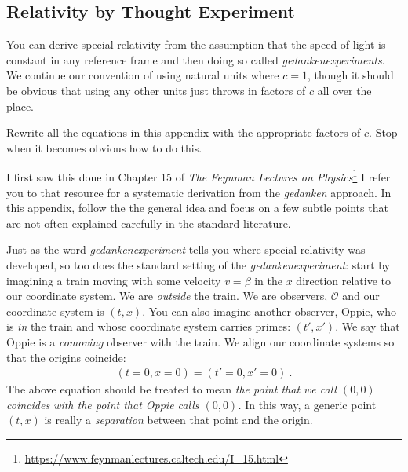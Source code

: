 \begin{subappendices}

\section{Relativity by Thought Experiment}\label{sec:subappendix:relativity}
You can derive special relativity from the assumption that the speed of light is constant in any reference frame and then doing so called \emph{gedankenexperiments}. We continue our convention of using natural units where $c=1$, though it should be obvious that using any other units just throws in factors of $c$ all over the place.
\begin{exercise}
Rewrite all the equations in this appendix with the appropriate factors of $c$. Stop when it becomes obvious how to do this. 
\end{exercise}
I first saw this done in Chapter 15 of \emph{The Feynman Lectures on Physics}\footnote{\url{https://www.feynmanlectures.caltech.edu/I_15.html}} I refer you to that resource for a systematic derivation from the \emph{gedanken} approach. In this appendix, follow the the general idea and focus on a few subtle points that are not often explained carefully in the standard literature.

Just as the word \emph{gedankenexperiment} tells you where special relativity was developed, so too does the standard setting of the \emph{gedankenexperiment}: start by imagining a train moving with some velocity $v=\beta$ in the $x$ direction relative to our coordinate system. We are \emph{outside} the train. We are observers, $\mathcal O$ and our coordinate system is $(t,x)$. You can also imagine another observer, Oppie, who is \emph{in} the train and whose coordinate system carries primes: $(t',x')$. We say that Oppie is a \emph{comoving} observer with the train. We align our coordinate systems so that the origins coincide: 
\begin{align}
    (t=0,x=0) = (t'=0,x'=0) \ .
\end{align}
The above equation should be treated to mean \emph{the point that we call $(0,0)$ coincides with the point that Oppie calls $(0,0)$.} In this way, a generic point $(t,x)$ is really a \emph{separation} between that point and the origin.



\end{subappendices}
